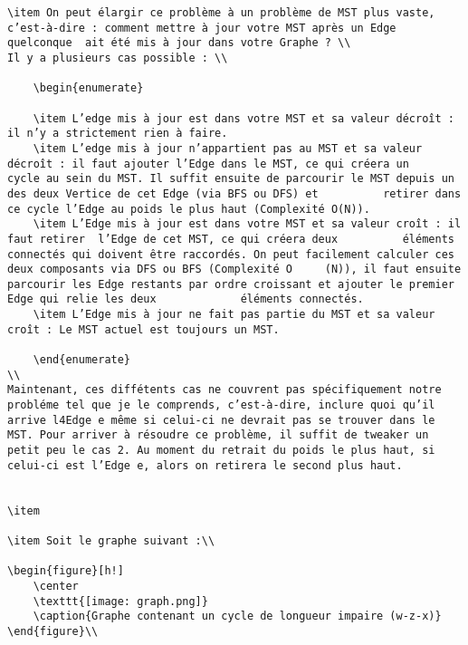 \documentclass[11pt]{article}
\begin{document}
\begin{enumerate}
\begin {verbatim}
\item On peut élargir ce problème à un problème de MST plus vaste, c’est-à-dire : comment mettre à jour votre MST après un Edge quelconque  ait été mis à jour dans votre Graphe ? \\
Il y a plusieurs cas possible : \\

	\begin{enumerate}
	
	\item L’edge mis à jour est dans votre MST et sa valeur décroît : il n’y a strictement rien à faire.
	\item L’edge mis à jour n’appartient pas au MST et sa valeur décroît : il faut ajouter l’Edge dans le MST, ce qui créera un 		cycle au sein du MST. Il suffit ensuite de parcourir le MST depuis un des deux Vertice de cet Edge (via BFS ou DFS) et 			retirer dans ce cycle l’Edge au poids le plus haut (Complexité O(N)).
	\item L’Edge mis à jour est dans votre MST et sa valeur croît : il faut retirer  l’Edge de cet MST, ce qui créera deux 			éléments connectés qui doivent être raccordés. On peut facilement calculer ces deux composants via DFS ou BFS (Complexité O		(N)), il faut ensuite parcourir les Edge restants par ordre croissant et ajouter le premier Edge qui relie les deux 			éléments connectés.
	\item L’Edge mis à jour ne fait pas partie du MST et sa valeur croît : Le MST actuel est toujours un MST.
	
	\end{enumerate}
\\
Maintenant, ces diffétents cas ne couvrent pas spécifiquement notre probléme tel que je le comprends, c’est-à-dire, inclure quoi qu’il arrive l4Edge e même si celui-ci ne devrait pas se trouver dans le MST. Pour arriver à résoudre ce problème, il suffit de tweaker un petit peu le cas 2. Au moment du retrait du poids le plus haut, si celui-ci est l’Edge e, alors on retirera le second plus haut.


\item 

\item Soit le graphe suivant :\\

\begin{figure}[h!]
    \center
    \texttt{[image: graph.png]}
    \caption{Graphe contenant un cycle de longueur impaire (w-z-x)}
\end{figure}\\


\end{verbatim}
\end{enumerate}
\end{document}
